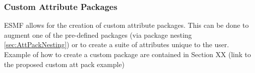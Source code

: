 \vspace{.20in}




\subsubsection{Custom Attribute Packages}
\label{sec:CustomAttPacks}

ESMF allows for the creation of custom attribute packages. This can be done to augment one of the pre-defined packages (via package nesting \ref{sec:AttPackNesting}) or to create a suite of 
attributes unique to the user. Example of how to create a custom package are contained in Section XX (link to the proposed custom att pack example)